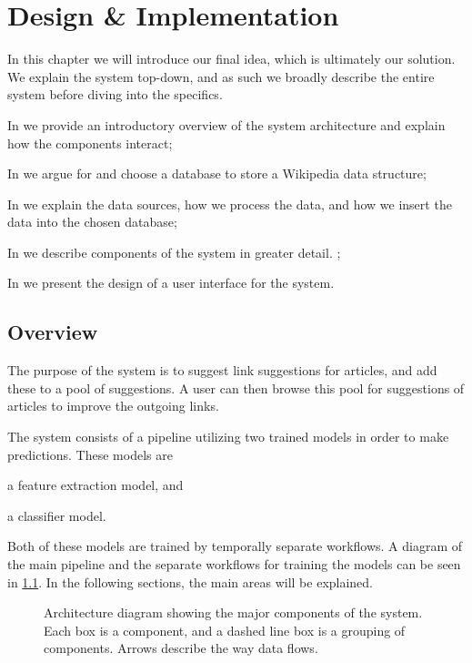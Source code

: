 \chapter{Design \& Implementation}\label{chap:design}
In this chapter we will introduce our final idea, which is ultimately our solution. We explain the system top-down, and as such we broadly describe the entire system before diving into the specifics.

\begin{chapterorganization}
  \item In  we provide an introductory overview of the system architecture and explain how the components interact;
  \item In  we argue for and choose a database to store a Wikipedia data structure;
  \item In  we explain the data sources, how we process the data, and how we insert the data into the chosen database;
  \item In  we describe components of the system in greater detail. ;
  \item In  we present the design of a user interface for the system.
\end{chapterorganization}

\section{Overview}\label{sec:design_overview}
The purpose of the system is to suggest link suggestions for articles, and add these to a pool of suggestions. A user can then browse this pool for suggestions of articles to improve the outgoing links.

The system consists of a pipeline utilizing two trained models in order to make predictions. These models are
\begin{enumerate*}[label=(\roman*)]
  \item a feature extraction model, and
  \item a classifier model.
\end{enumerate*}
Both of these models are trained by temporally separate workflows. A diagram of the main pipeline and the separate workflows for training the models can be seen in \cref{fig:system-overview}. In the following sections, the main areas will be explained.

\begin{figure}[tbp]%
  \centering
  
\caption[short desc]{Architecture diagram showing the major components of the system. Each box is a component, and a dashed line box is a grouping of components. Arrows describe the way data flows.}%
\label{fig:system-overview}%
\end{figure}

